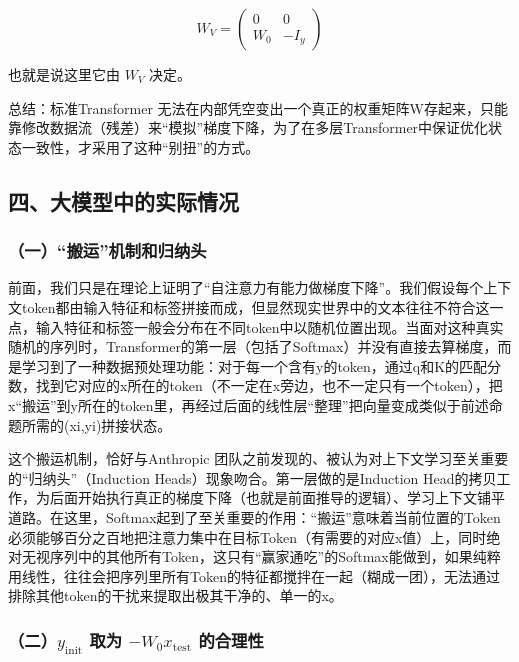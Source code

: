 \[
W_V=\begin{pmatrix}0&0\\W_0&-I_y\end{pmatrix}
\]

也就是说这里它由 \(W_V\) 决定。

总结：标准Transformer 无法在内部凭空变出一个真正的权重矩阵W存起来，只能靠修改数据流（残差）来``模拟''梯度下降，为了在多层Transformer中保证优化状态一致性，才采用了这种``别扭''的方式。

\hypertarget{ux56dbux5927ux6a21ux578bux4e2dux7684ux5b9eux9645ux60c5ux51b5}{%
\subsection{四、大模型中的实际情况}\label{ux56dbux5927ux6a21ux578bux4e2dux7684ux5b9eux9645ux60c5ux51b5}}

\hypertarget{ux4e00ux642cux8fd0ux673aux5236ux548cux5f52ux7eb3ux5934}{%
\subsubsection{（一）``搬运''机制和归纳头}\label{ux4e00ux642cux8fd0ux673aux5236ux548cux5f52ux7eb3ux5934}}

前面，我们只是在理论上证明了``自注意力有能力做梯度下降''。我们假设每个上下文token都由输入特征和标签拼接而成，但显然现实世界中的文本往往不符合这一点，输入特征和标签一般会分布在不同token中以随机位置出现。当面对这种真实随机的序列时，Transformer的第一层（包括了Softmax）并没有直接去算梯度，而是学习到了一种数据预处理功能：对于每一个含有y的token，通过q和K的匹配分数，找到它对应的x所在的token（不一定在x旁边，也不一定只有一个token），把x``搬运''到y所在的token里，再经过后面的线性层``整理''把向量变成类似于前述命题所需的(xi,yi)拼接状态。

这个搬运机制，恰好与Anthropic 团队之前发现的、被认为对上下文学习至关重要的``归纳头''（Induction Heads）现象吻合。第一层做的是Induction Head的拷贝工作，为后面开始执行真正的梯度下降（也就是前面推导的逻辑）、学习上下文铺平道路。在这里，Softmax起到了至关重要的作用：``搬运''意味着当前位置的Token必须能够百分之百地把注意力集中在目标Token（有需要的对应x值）上，同时绝对无视序列中的其他所有Token，这只有``赢家通吃''的Softmax能做到，如果纯粹用线性，往往会把序列里所有Token的特征都搅拌在一起（糊成一团），无法通过排除其他token的干扰来提取出极其干净的、单一的x。

\hypertarget{ux4e8cy_mathrminit-ux53d6ux4e3a--w_0x_mathrmtest-ux7684ux5408ux7406ux6027}{%
\subsubsection{\texorpdfstring{（二）\(y_{\mathrm{init}}\) 取为 \(-W_0x_{\mathrm{test}}\) 的合理性}{（二）y\_\{\textbackslash mathrm\{init\}\} 取为 -W\_0x\_\{\textbackslash mathrm\{test\}\} 的合理性}}\label{ux4e8cy_mathrminit-ux53d6ux4e3a--w_0x_mathrmtest-ux7684ux5408ux7406ux6027}}

